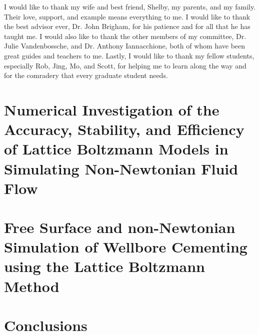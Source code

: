 \documentclass[pdftex,ms]{pittetd}
\begin{document}
\preface
I would like to thank my wife and best friend, Shelby, my parents, and my family.
Their love, support, and example means everything to me.
I would like to thank the best advisor ever, Dr. John Brigham, for his patience and for all that he has taught me. 
I would also like to thank the other members of my committee, Dr. Julie Vandenbossche, and Dr. Anthony Iannacchione, both of whom have been great guides and teachers to me.
Lastly, I would like to thank my fellow students, especially Rob, Jing, Mo, and Scott, for helping me to learn along the way and for the comradery that every graduate student needs.

\chapter{Numerical Investigation of the Accuracy, Stability, and Efficiency of Lattice Boltzmann Models in Simulating Non-Newtonian Fluid Flow} \label{chap:lbm-stability}



\chapter{Free Surface and non-Newtonian Simulation of Wellbore Cementing using the Lattice Boltzmann Method} \label{chap:lbm-cement}



\chapter{Conclusions}
\end{document}
